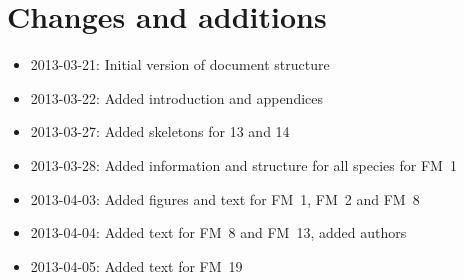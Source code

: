 \chapter{Changes and additions}
\label{ch:changes}

\begin{itemize}
    \item 2013-03-21: Initial version of document structure
    \item 2013-03-22: Added introduction and appendices
    \item 2013-03-27: Added skeletons for 13 and 14
    \item 2013-03-28: Added information and structure for all species for FM~1
    \item 2013-04-03: Added figures and text for FM~1, FM~2 and FM~8
    \item 2013-04-04: Added text for FM~8 and FM~13, added authors
    \item 2013-04-05: Added text for FM~19
\end{itemize}
